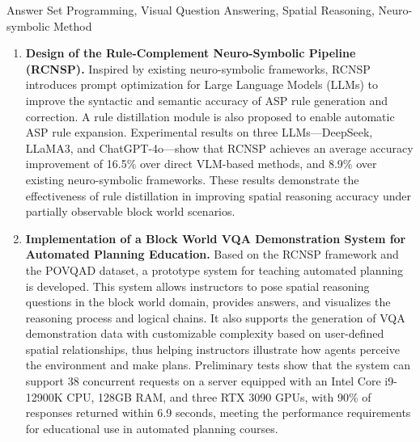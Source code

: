 \begin{englishabstract}{Answer Set Programming, Visual Question Answering, Spatial Reasoning, Neuro-symbolic Method}
\begin{enumerate}[nosep]
\item \textbf{Design of the Rule-Complement Neuro-Symbolic Pipeline (RCNSP).}  
Inspired by existing neuro-symbolic frameworks, RCNSP introduces prompt optimization for Large Language Models (LLMs) to improve the syntactic and semantic accuracy of ASP rule generation and correction. A rule distillation module is also proposed to enable automatic ASP rule expansion. Experimental results on three LLMs—DeepSeek, LLaMA3, and ChatGPT-4o—show that RCNSP achieves an average accuracy improvement of 16.5\% over direct VLM-based methods, and 8.9\% over existing neuro-symbolic frameworks. These results demonstrate the effectiveness of rule distillation in improving spatial reasoning accuracy under partially observable block world scenarios.

\item \textbf{Implementation of a Block World VQA Demonstration System for Automated Planning Education.}  
Based on the RCNSP framework and the POVQAD dataset, a prototype system for teaching automated planning is developed. This system allows instructors to pose spatial reasoning questions in the block world domain, provides answers, and visualizes the reasoning process and logical chains. It also supports the generation of VQA demonstration data with customizable complexity based on user-defined spatial relationships, thus helping instructors illustrate how agents perceive the environment and make plans. Preliminary tests show that the system can support 38 concurrent requests on a server equipped with an Intel Core i9-12900K CPU, 128GB RAM, and three RTX 3090 GPUs, with 90\% of responses returned within 6.9 seconds, meeting the performance requirements for educational use in automated planning courses.
\end{enumerate}
\end{englishabstract}

\tableofcontents
\listofothers
